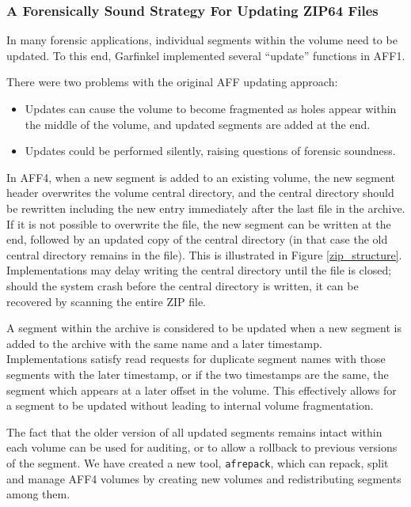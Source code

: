 \documentclass[10pt, conference]{IEEEtran}
\begin{document}
\subsubsection{A Forensically Sound Strategy For Updating ZIP64 Files}

In many forensic applications, individual segments within the volume
need to be updated. To this end, Garfinkel implemented several
``update'' functions in AFF1\cite{garfinkel:aff}. 

There were two problems with the original AFF updating approach:
\begin{itemize}
\item Updates can cause the volume to
become fragmented as holes appear within the middle of the volume, and
updated segments are added at the end.
\item Updates could be performed silently, raising questions of
  forensic soundness.
\end{itemize}

In AFF4, when a new segment is added to an existing volume, the new
segment header overwrites the volume central directory, and the
central directory should be rewritten including the new entry
immediately after the last file in the archive. If it is not possible
to overwrite the file, the new segment can be written at the end,
followed by an updated copy of the central directory (in that case the
old central directory remains in the file). This is illustrated in
Figure \ref{zip_structure}. Implementations may delay
writing the central directory until the file is closed; should the
system crash before the central directory is written, it can be
recovered by scanning the entire ZIP file.

A segment within the archive is considered to be updated when a new
segment is added to the archive with the same name and a later
timestamp. Implementations satisfy read requests for duplicate
segment names with those segments with the later timestamp, or if the
two timestamps are the same, the segment which appears at a later
offset in the volume. This effectively allows for a segment to be
updated without leading to internal volume fragmentation.

The fact that the older version of all updated segments remains intact
within each volume can be used for auditing, or to allow a rollback to
previous versions of the segment. We have created a new tool,
\texttt{afrepack}, which can repack, split and manage AFF4 volumes by
creating new volumes and redistributing segments among them.
\end{document}
